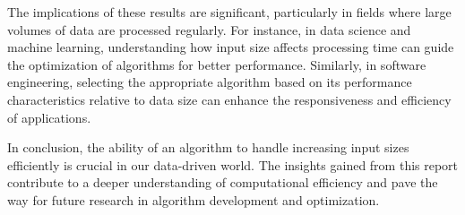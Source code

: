 \documentclass{article}
\begin{document}
    The implications of these results are significant, particularly in fields where large volumes of data are processed regularly. For instance, in data science and machine learning, understanding how input size affects processing time can guide the optimization of algorithms for better performance. Similarly, in software engineering, selecting the appropriate algorithm based on its performance characteristics relative to data size can enhance the responsiveness and efficiency of applications.
    
    In conclusion, the ability of an algorithm to handle increasing input sizes efficiently is crucial in our data-driven world. The insights gained from this report contribute to a deeper understanding of computational efficiency and pave the way for future research in algorithm development and optimization.
        
\newpage

\end{document}

